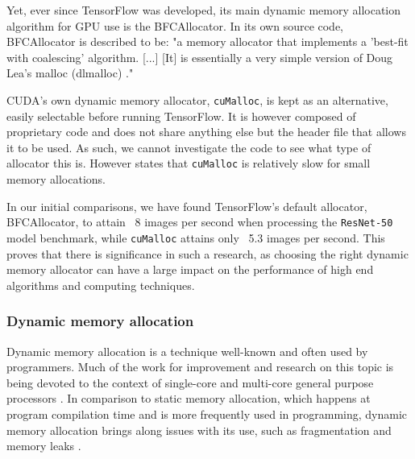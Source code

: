 \documentclass[12pt,twoside]{article}
\begin{document}
Yet, ever since TensorFlow was developed, its main dynamic memory allocation algorithm for GPU use is the BFCAllocator. In its own source code, BFCAllocator is described to be: "a memory allocator that implements a 'best-fit with coalescing' algorithm.  [...] [It] is essentially a very simple version of Doug Lea's malloc (dlmalloc) \cite{dlmalloc}."

CUDA's own dynamic memory allocator, \texttt{cuMalloc}, is kept as an alternative, easily selectable before running TensorFlow. It is however composed of proprietary code and does not share anything else but the header file that allows it to be used. As such, we cannot investigate the code to see what type of allocator this is. However \citeauthor{Vinkler2015} states that \texttt{cuMalloc} is relatively slow for small memory allocations.

In our initial comparisons, we have found TensorFlow's default allocator, BFCAllocator, to attain ~8 images per second when processing the \texttt{ResNet-50} model benchmark, while \texttt{cuMalloc} attains only ~5.3 images per second. This proves that there is significance in such a research, as choosing the right dynamic memory allocator can have a large impact on the performance of high end algorithms and computing techniques.

\subsubsection*{Dynamic memory allocation}

Dynamic memory allocation is a technique well-known and often used by programmers. Much of the work for improvement and research on this topic is being devoted to the context of single-core and multi-core general purpose processors \cite{YOU2015}. In comparison to static memory allocation, which happens at program compilation time and is more frequently used in programming, dynamic memory allocation brings along issues with its use, such as fragmentation and memory leaks \cite{TRAISTER199099}.
\end{document}

